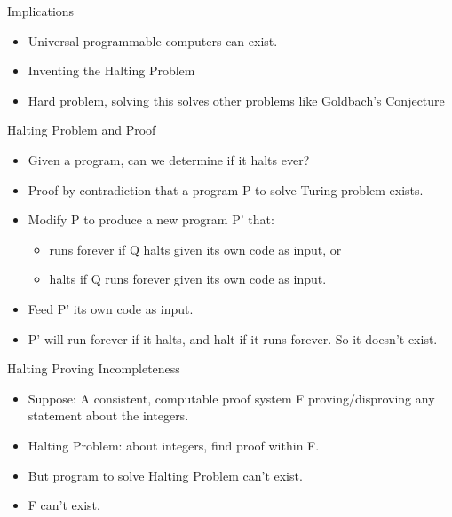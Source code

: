 \documentclass[
    11pt, %
    aspectratio=169, %
]{beamer}
\begin{document}
\begin{frame}{Implications}
    \begin{itemize}
        \item Universal programmable computers can exist.
        \item Inventing the Halting Problem
        \item Hard problem, solving this solves other problems like Goldbach's Conjecture
    \end{itemize}
\end{frame}
\begin{frame}{Halting Problem and Proof}
 \begin{itemize}
        \item Given a program, can we determine if it halts ever?
        \item Proof by contradiction that a program P to solve Turing problem exists.
        \item Modify P to produce a new program P’ that:
        \begin{itemize}
            \item  runs forever if Q halts given its own code as input, or
            \item halts if Q runs forever given its own code as input. 
        \end{itemize}
        \item Feed P' its own code as input.
        \item P' will run forever if it halts, and halt if it runs forever. So it doesn't exist.
    \end{itemize}
    
\end{frame}
\begin{frame}{Halting Proving Incompleteness}
    \begin{itemize}
        \item Suppose: A consistent, computable proof system F proving/disproving any statement about the integers.
        \item<1-> Halting Problem: about integers, find proof within F.
        \item<2-> But program to solve Halting Problem can't exist.
        \item<3-> F can't exist.
    \end{itemize}
\end{frame}
\end{document}
